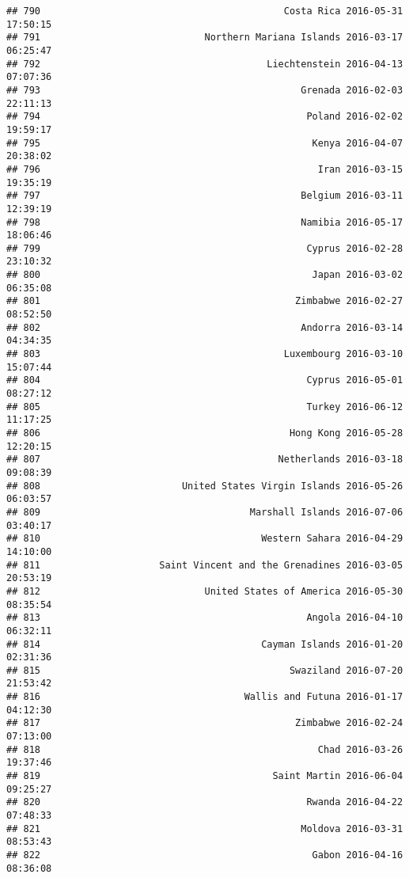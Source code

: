 \documentclass[
]{article}
\begin{document}
\begin{verbatim}
## 790                                           Costa Rica 2016-05-31 17:50:15
## 791                             Northern Mariana Islands 2016-03-17 06:25:47
## 792                                        Liechtenstein 2016-04-13 07:07:36
## 793                                              Grenada 2016-02-03 22:11:13
## 794                                               Poland 2016-02-02 19:59:17
## 795                                                Kenya 2016-04-07 20:38:02
## 796                                                 Iran 2016-03-15 19:35:19
## 797                                              Belgium 2016-03-11 12:39:19
## 798                                              Namibia 2016-05-17 18:06:46
## 799                                               Cyprus 2016-02-28 23:10:32
## 800                                                Japan 2016-03-02 06:35:08
## 801                                             Zimbabwe 2016-02-27 08:52:50
## 802                                              Andorra 2016-03-14 04:34:35
## 803                                           Luxembourg 2016-03-10 15:07:44
## 804                                               Cyprus 2016-05-01 08:27:12
## 805                                               Turkey 2016-06-12 11:17:25
## 806                                            Hong Kong 2016-05-28 12:20:15
## 807                                          Netherlands 2016-03-18 09:08:39
## 808                         United States Virgin Islands 2016-05-26 06:03:57
## 809                                     Marshall Islands 2016-07-06 03:40:17
## 810                                       Western Sahara 2016-04-29 14:10:00
## 811                     Saint Vincent and the Grenadines 2016-03-05 20:53:19
## 812                             United States of America 2016-05-30 08:35:54
## 813                                               Angola 2016-04-10 06:32:11
## 814                                       Cayman Islands 2016-01-20 02:31:36
## 815                                            Swaziland 2016-07-20 21:53:42
## 816                                    Wallis and Futuna 2016-01-17 04:12:30
## 817                                             Zimbabwe 2016-02-24 07:13:00
## 818                                                 Chad 2016-03-26 19:37:46
## 819                                         Saint Martin 2016-06-04 09:25:27
## 820                                               Rwanda 2016-04-22 07:48:33
## 821                                              Moldova 2016-03-31 08:53:43
## 822                                                Gabon 2016-04-16 08:36:08

\end{verbatim}
\end{document}
